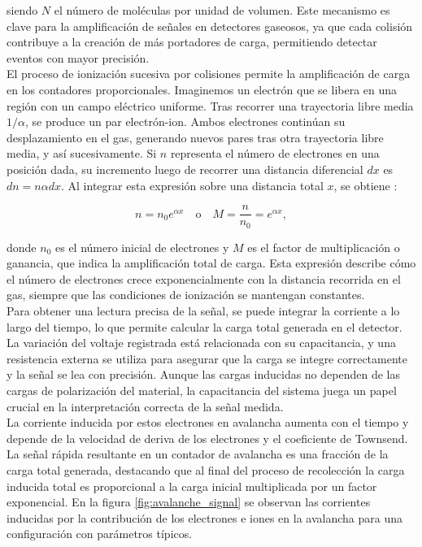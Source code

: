 \documentclass{article}
\begin{document}
\noindent siendo $N$ el número de moléculas por unidad de volumen. Este mecanismo es clave para la amplificación de señales en detectores gaseosos, ya que cada colisión contribuye a la creación de más portadores de carga, permitiendo detectar eventos con mayor precisión.\\

\noindent El proceso de ionización sucesiva por colisiones permite la amplificación de carga en los contadores proporcionales. Imaginemos un electrón que se libera en una región con un campo eléctrico uniforme. Tras recorrer una trayectoria libre media $1/\alpha$, se produce un par electrón-ion. Ambos electrones continúan su desplazamiento en el gas, generando nuevos pares tras otra trayectoria libre media, y así sucesivamente. Si $n$ representa el número de electrones en una posición dada, su incremento luego de recorrer una distancia diferencial $dx$ es $dn = n \alpha dx$. Al integrar esta expresión sobre una distancia total $x$, se obtiene \cite{raether1964electron}:

\begin{equation}
n = n_0 e^{\alpha x} \quad \text{o} \quad M = \frac{n}{n_0} = e^{\alpha x},
\label{eq:multiplication}
\end{equation}

\noindent donde \(n_0\) es el número inicial de electrones y \(M\) es el factor de multiplicación o ganancia, que indica la amplificación total de carga. Esta expresión describe cómo el número de electrones crece exponencialmente con la distancia recorrida en el gas, siempre que las condiciones de ionización se mantengan constantes.\\

\noindent Para obtener una lectura precisa de la señal, se puede integrar la corriente a lo largo del tiempo, lo que permite calcular la carga total generada en el detector. La variación del voltaje registrada está relacionada con su capacitancia, y una resistencia externa se utiliza para asegurar que la carga se integre correctamente y la señal se lea con precisión. Aunque las cargas inducidas no dependen de las cargas de polarización del material, la capacitancia del sistema juega un papel crucial en la interpretación correcta de la señal medida.\\

\noindent La corriente inducida por estos electrones en avalancha aumenta con el tiempo y depende de la velocidad de deriva de los electrones y el coeficiente de Townsend. La señal rápida resultante en un contador de avalancha es una fracción de la carga total generada, destacando que al final del proceso de recolección la carga inducida total es proporcional a la carga inicial multiplicada por un factor exponencial. En la figura \ref{fig:avalanche_signal} se observan las corrientes inducidas por la contribución de los electrones e iones en la avalancha para una configuración con parámetros típicos.
\end{document}
